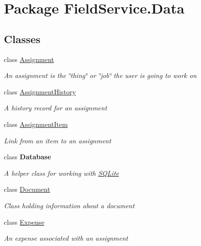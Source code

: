\hypertarget{namespace_field_service_1_1_data}{\section{Package Field\+Service.\+Data}
\label{namespace_field_service_1_1_data}
}
\subsection*{Classes}
\begin{DoxyCompactItemize}
\item 
class \hyperlink{class_field_service_1_1_data_1_1_assignment}{Assignment}
\begin{DoxyCompactList}\small\item\em An assignment is the \char`\"{}thing\char`\"{} or \char`\"{}job\char`\"{} the user is going to work on \end{DoxyCompactList}\item 
class \hyperlink{class_field_service_1_1_data_1_1_assignment_history}{Assignment\+History}
\begin{DoxyCompactList}\small\item\em A history record for an assignment \end{DoxyCompactList}\item 
class \hyperlink{class_field_service_1_1_data_1_1_assignment_item}{Assignment\+Item}
\begin{DoxyCompactList}\small\item\em Link from an item to an assignment \end{DoxyCompactList}\item 
class {\bfseries Database}
\begin{DoxyCompactList}\small\item\em A helper class for working with \hyperlink{namespace_s_q_lite}{S\+Q\+Lite} \end{DoxyCompactList}\item 
class \hyperlink{class_field_service_1_1_data_1_1_document}{Document}
\begin{DoxyCompactList}\small\item\em Class holding information about a document \end{DoxyCompactList}\item 
class \hyperlink{class_field_service_1_1_data_1_1_expense}{Expense}
\begin{DoxyCompactList}\small\item\em An expense associated with an assignment \end{DoxyCompactList}\item 

\end{DoxyCompactItemize}
